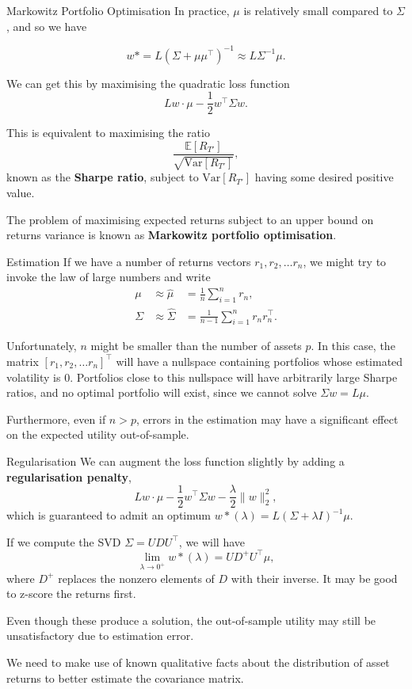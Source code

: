 \documentclass{beamer}
\begin{document}
\begin{frame}{Markowitz Portfolio Optimisation}
	In practice, $\mu$ is relatively small compared to $\Sigma$, and so we have

	$$w* = L(\Sigma+\mu\mu^\top)^{-1}\approx L\Sigma^{-1}\mu.$$

	We can get this by maximising the quadratic loss function
	$$Lw\cdot \mu - \frac{1}{2}w^\top \Sigma w.$$

	This is equivalent to maximising the ratio
	$$\frac{\mathbb{E}[R_{T'}]}{\sqrt{\mathrm{Var}[R_{T'}]}},$$
	known as the \textbf{Sharpe ratio}, subject to $\mathrm{Var}[R_{T'}]$ having some desired positive value. %

	The problem of maximising expected returns subject to an upper bound on returns variance is known as \textbf{Markowitz portfolio optimisation}.%

\end{frame}

\begin{frame}{Estimation}
	If we have a number of returns vectors $r_1,r_2,\ldots r_n$, we might try to invoke the law of large numbers and write
	\begin{align*}
		\mu	&\approx \hat{\mu}	&= \frac{1}{n} \sum_{i=1}^n r_n,
	\\	\Sigma	&\approx \hat{\Sigma}	&= \frac{1}{n-1} \sum_{i=1}^n r_n r_n^\top.
	\end{align*}

	Unfortunately, $n$ might be smaller than the number of assets $p$. In this case, the matrix $[r_1,r_2,\ldots r_n]^\top$ will have a nullspace containing portfolios whose estimated volatility is $0$. Portfolios close to this nullspace will have arbitrarily large Sharpe ratios, and no optimal portfolio will exist, since we cannot solve $\Sigma w = L\mu$.

	Furthermore, even if $n>p$, errors in the estimation may have a significant effect on the expected utility out-of-sample.
\end{frame}

\begin{frame}{Regularisation}
	We can augment the loss function slightly by adding a \textbf{regularisation penalty},
	$$Lw\cdot\mu-\frac{1}{2}w^\top\Sigma w-\frac{\lambda}{2}\|w\|_2^2,$$
	which is guaranteed to admit an optimum $w*(\lambda) = L(\Sigma+\lambda I)^{-1}\mu$.

	If we compute the SVD $\Sigma=UDU^\top$, we will have
	$$\lim_{\lambda\to 0^+}w*(\lambda) = UD^+U^\top\mu,$$
	where $D^+$ replaces the nonzero elements of $D$ with their inverse. It may be good to z-score the returns first.%

	Even though these produce a solution, the out-of-sample utility may still be unsatisfactory due to estimation error.

	We need to make use of known qualitative facts about the distribution of asset returns to better estimate the covariance matrix.
\end{frame}
\end{document}
